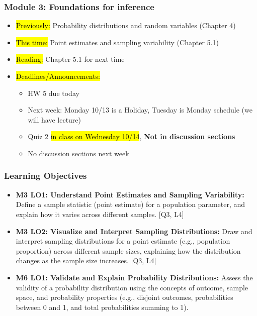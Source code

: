 
\begin{frame}
    \frametitle{Module 3: Foundations for inference}
    \begin{itemize}
        \item \hl{Previously: }Probability distributions and random variables (Chapter 4)
        \item \hl{This time: }Point estimates and sampling variability (Chapter 5.1)
        \item \hl{Reading: }Chapter 5.1 for next time
        \item \hl{Deadlines/Announcements: }
        \begin{itemize}
            \item HW 5 due today
            \item Next week: Monday 10/13 is a Holiday, Tuesday is Monday schedule (we will have lecture)
            \item Quiz 2 \hl{in class on Wednesday 10/14}, \textbf{Not in discussion sections}
            \item No discussion sections next week
        \end{itemize}
    \end{itemize}
    
\end{frame}

\begin{frame}
\frametitle{Learning Objectives}
\begin{itemize}
    \item \textbf{M3 LO1: Understand Point Estimates and Sampling Variability:} Define a sample statistic (point estimate) for a population parameter, and explain how it varies across different samples. [Q3, L4] 
    \item \textbf{M3 LO2: Visualize and Interpret Sampling Distributions:} Draw and interpret sampling distributions for a point estimate (e.g., population proportion) across different sample sizes, explaining how the distribution changes as the sample size increases. [Q3, L4]     \item \textbf{M6 LO1: Validate and Explain Probability Distributions:} Assess the validity of a probability distribution using the concepts of outcome, sample space, and probability properties (e.g., disjoint outcomes, probabilities between 0 and 1, and total probabilities summing to 1).
\end{itemize}
\end{frame}
